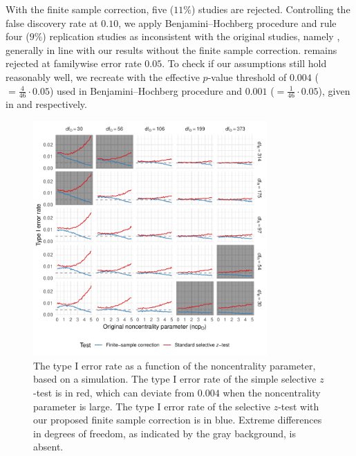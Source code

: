 \documentclass[11pt]{article}
\theoremstyle{definition}
\theoremstyle{custom}
\begin{document}
  With the finite sample correction, five ($11\%$) studies are rejected. Controlling the false discovery rate at $0.10$, we apply Benjamini--Hochberg  procedure \citeyearpar{Benjamini:1995cd} and rule four ($9\%$) replication studies as inconsistent with the original studies, namely \citet{Dodson:2008ks,vanDijk:2008br,PurdieVaughns:2008en,Farris:2008ev}, generally in line with our results without the finite sample correction. \citet{Farris:2008ev} remains rejected at familywise error rate $0.05$. To check if our assumptions still hold reasonably well, we recreate  with the effective $p$-value threshold of $0.004$ ($=\frac{4}{46} \cdot 0.05$) used in Benjamini--Hochberg procedure and $0.001$ ($=\frac{1}{46} \cdot 0.05$), given in  and  respectively.
  \begin{figure}[htbp]
    \centering
    \includegraphics[width=0.8\textwidth]{t-approx-bh}
    \caption{The type I error rate as a function of the noncentrality parameter, based on a simulation. The type I error rate of the simple selective $z$-test is in red, which can deviate from $0.004$ when the noncentrality parameter is large. The type I error rate of the selective $z$-test with our proposed finite sample correction is in blue. Extreme differences in degrees of freedom, as indicated by the gray background, is absent.}
  \label{fig:t-approx-bh}
  \end{figure}
\end{document}
